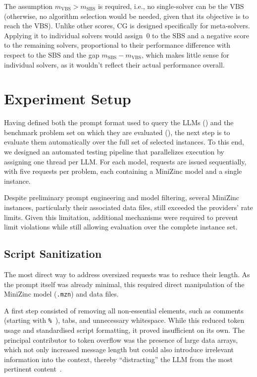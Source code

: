 \documentclass[../../main]{subfiles}
\begin{document}
\noindent

The assumption $m_{\mathrm{VBS}} > m_{\mathrm{SBS}}$ is required, i.e., no single-solver can be the $\mathrm{VBS}$ (otherwise, no algorithm selection would be needed, given that its objective is to reach the $\mathrm{VBS}$). Unlike other scores, CG is designed specifically for meta-solvers. Applying it to individual solvers would assign~0 to the $\mathrm{SBS}$ and a negative score to the remaining solvers,
proportional to their performance difference with respect to the $\mathrm{SBS}$ and
the gap $m_{\mathrm{SBS}} - m_{\mathrm{VBS}}$, which makes little sense for
individual solvers, as it wouldn't reflect their actual performance overall. 

\section{Experiment Setup}
\label{sec:expSetup}
Having defined both the prompt format used to query the LLMs () and the benchmark problem set on which they are evaluated (), the next step is to evaluate them automatically over the full set of selected instances.
To this end, we designed an automated testing pipeline that parallelizes execution by assigning one thread per LLM. For each model, requests are issued sequentially, with five requests per problem, each containing a MiniZinc model and a single instance. %

Despite preliminary prompt engineering and model filtering, several MiniZinc instances, particularly their associated data files, still exceeded the providers' rate limits. Given this limitation, additional mechanisms were required to prevent limit violations while still allowing evaluation over the complete instance set.

\subsection{Script Sanitization}
\label{sec:scriptMan}

The most direct way to address oversized requests was to reduce their length. As the prompt itself was already minimal, this required direct manipulation of the MiniZinc model (\texttt{.mzn}) and data files.

A first step consisted of removing all non-essential elements, such as comments (starting with \texttt{\%}~\cite{MiniZinc}), tabs, and unnecessary whitespace. While this reduced token usage and standardised script formatting, it proved insufficient on its own. The principal contributor to token overflow was the presence of large data arrays, which not only increased message length but could also introduce irrelevant information into the context, thereby ``distracting'' the LLM from the most pertinent content~\cite{LLMdistract}.
\end{document}
